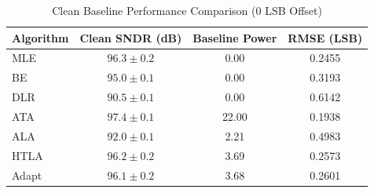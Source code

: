 \begin{table}[t]
\centering
\caption{Clean Baseline Performance Comparison (0 LSB Offset)}
\label{tab:clean_baseline}
\begin{tabular}{lccc}
\toprule
\textbf{Algorithm} & \textbf{Clean SNDR (dB)} & \textbf{Baseline Power} & \textbf{RMSE (LSB)} \\
\midrule
MLE & $96.3 \pm 0.2$ & 0.00 & 0.2455 \\
BE & $95.0 \pm 0.1$ & 0.00 & 0.3193 \\
DLR & $90.5 \pm 0.1$ & 0.00 & 0.6142 \\
ATA & $97.4 \pm 0.1$ & 22.00 & 0.1938 \\
ALA & $92.0 \pm 0.1$ & 2.21 & 0.4983 \\
HTLA & $96.2 \pm 0.2$ & 3.69 & 0.2573 \\
Adapt & $96.1 \pm 0.2$ & 3.68 & 0.2601 \\
\bottomrule
\end{tabular}
\end{table}
